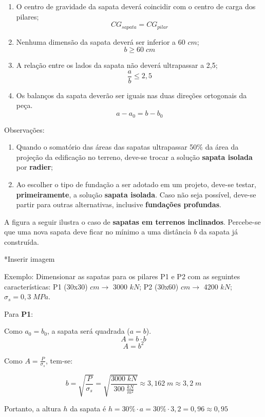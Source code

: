 \begin{enumerate}
	\item O centro de gravidade da sapata deverá coincidir com o centro de carga dos pilares; $${CG}_{sapata}={CG}_{pilar}$$
	\item Nenhuma dimensão da sapata deverá ser inferior a 60 $cm$; $$b\geqslant60\;cm$$
	\item A relação entre os lados da sapata não deverá ultrapassar a 2,5; $$\frac{a}{b}\leqslant2,5$$
	\item Os balanços da sapata deverão ser iguais nas duas direções ortogonais da peça.\begin{equation}\label{equacao-equilibrio-balancos}a-a_0=b-b_0\end{equation}
\end{enumerate}

Observações:

\begin{enumerate}
	\item Quando o somatório das áreas das sapatas ultrapassar 50\% da área da projeção da edificação no terreno, deve-se trocar a solução \textbf{sapata isolada} por \textbf{radier};
	\item Ao escolher o tipo de fundação a ser adotado em um projeto, deve-se testar, \textbf{primeiramente}, a solução \textbf{sapata isolada}. Caso não seja possível, deve-se partir para outras alternativas, inclusive \textbf{fundações profundas}.
\end{enumerate}

A figura a seguir ilustra o caso de \textbf{sapatas em terrenos inclinados}. Percebe-se que uma nova sapata deve ficar no mínimo a uma distância $b$ da sapata já construída.

*Inserir imagem

Exemplo: Dimensionar as sapatas para os pilares P1 e P2 com as seguintes características:
P1 (30x30) $cm\rightarrow$ 3000 $kN$; P2 (30x60) $cm\rightarrow$ 4200 $kN$; $\sigma_s=0,3\;MPa$.

Para \textbf{P1}:

Como $a_0=b_0$, a sapata será quadrada ($a=b$). $$A=b\cdot b$$ $$A=b^2$$

Como $A=\frac{P}{\sigma_s}$, tem-se:

$$b=\sqrt{\frac{P}{\sigma_s}}=\sqrt{\frac{3000\;kN}{300\;\frac{kN}{m^2}}}\approx3,162\;m\approx3,2\;m$$

Portanto, a altura $h$ da sapata é $h=30\%\cdot a=30\%\cdot 3,2=0,96\approx0,95$

